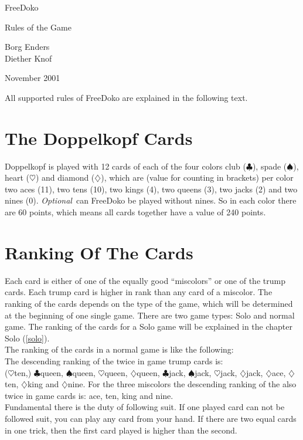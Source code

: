 \documentclass[12pt,a4paper]{article}
\newcommand{\kreuz}{$\clubsuit$}
\newcommand{\pik}{$\spadesuit$}
\newcommand{\herz}{$\heartsuit$}
\newcommand{\karo}{$\diamondsuit$}
\newcommand{\Optional}{\textit{Optional}}
\begin{document}
\thispagestyle{empty}
\parindent=0pt

\begin{center}
 \linespread{2.0}
{\Huge
FreeDoko

\vspace{2cm}
Rules of the Game

\vspace{2cm}
}
{\large

\vspace{2cm}
Borg Enders\\
Diether Knof

\vspace{2cm}

}

\vspace{2cm}

November 2001
\end{center}
\newpage
\tableofcontents \newpage
 All supported rules of FreeDoko are
explained in the following text.
\section{The Doppelkopf Cards} Doppelkopf is played with 12
cards of each of the four colors club (\kreuz), spade (\pik),
heart (\herz) and diamond (\karo), which are (value for counting
in brackets) per color two aces (11), two tens (10), two kings
(4), two queens (3), two jacks (2) and two nines (0). \Optional\
can FreeDoko be played without nines. So in each color there are
60 points, which means all cards together have a value of 240
points.
\section{Ranking Of
The Cards} Each card is either of one of the equally good
"`miscolors"' or one of the trump cards. Each trump card is
higher in rank than any card of a miscolor. The ranking of the
cards depends on the type of the game, which will be determined
at the beginning of one single game. There are two game types:
Solo and normal game. The ranking of the cards for a Solo game
will be explained in the chapter Solo (\ref{solo}).
\\
The ranking of the cards in a normal game is like the following:\\
The descending ranking of the twice in game trump cards is:\\
(\herz ten,) \kreuz queen, \pik queen, \herz queen, \karo queen,
\kreuz jack, \pik jack, \herz jack, \karo jack, \karo ace, \karo
ten, \karo king and \karo nine. For the three miscolors  the
descending ranking of the also twice in game cards is: ace, ten,
king and nine.
\\
Fundamental there is the duty of following suit. If one played
card can not be followed suit, you can play any card from your
hand. If there are two equal cards in one trick, then the first
card played is higher than the second.
\end{document}
